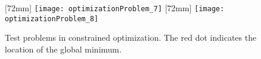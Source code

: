 \begin{figure}
  [72mm]{%
    \texttt{[image: optimizationProblem\_7]}%
  }%
  \hfill%
  [72mm]{%
    \texttt{[image: optimizationProblem\_8]}%
  }%
  \caption[%
    Constrained test problems%
  ]{%
    Test problems in constrained optimization.
    The \textcolor{C1}{red dot} indicates the location of the
    global minimum.%
  }%
  \label{fig:constrainedOptimizationProblem}%
\end{figure}
